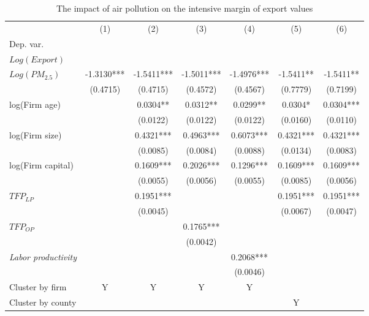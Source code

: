 \documentclass[12pt]{article}
\begin{document}
    \begin{table}[H]\centering
      \caption{The impact of air pollution on the intensive margin of export values}\label{tab:A1}
      \resizebox{\textwidth}{!}
      {
      \begin{tabular}{l*{6}{c}}
        \hline\hline
        &\multicolumn{1}{c}{(1)}&\multicolumn{1}{c}{(2)}&\multicolumn{1}{c}{(3)}&\multicolumn{1}{c}{(4)}&\multicolumn{1}{c}{(5)}&\multicolumn{1}{c}{(6)}\\
        Dep. var. &&&&\\ 
        $Log(Export)$ &&&&\\
        \hline
        $Log(PM_{2.5})$     & -1.3130***& -1.5411***&-1.5011***&-1.4976***&-1.5411**& -1.5411**\\
                                  &(0.4715)&(0.4715)  &(0.4572)  &(0.4567)& (0.7779) &(0.7199)\\
        log(Firm age)              &        &0.0304**  &0.0312**  &0.0299**&0.0304*&0.0304***\\
                                  &         &(0.0122) &(0.0122)  &(0.0122)&(0.0160)&(0.0110)\\
        log(Firm size)             &         &0.4321***&0.4963*** &0.6073***&0.4321***&0.4321***\\
                                  &         &(0.0085) &(0.0084)  &(0.0088)&(0.0134)&(0.0083)\\
        log(Firm capital)          &         &0.1609***&0.2026***& 0.1296***&0.1609***&0.1609***\\
                                  &         &(0.0055) &(0.0056) &(0.0055)&(0.0085)&(0.0056)\\
        $TFP_{LP}$                &         &0.1951***&         &        &0.1951***&0.1951***\\
                                  &         &(0.0045) &         &        &(0.0067)&(0.0047)\\
        $TFP_{OP}$                &         &          &0.1765***&&&\\
                                  &         &          &(0.0042)&&&\\
        \textit{Labor productivity} &      &           &&0.2068***&&\\
                                    &      &           &&(0.0046)&&\\
        \hline
        Cluster by firm  &Y&Y&Y&Y&&\\
        Cluster by county &&&&&Y&\\

\end{tabular}}
\end{table}
\end{document}
